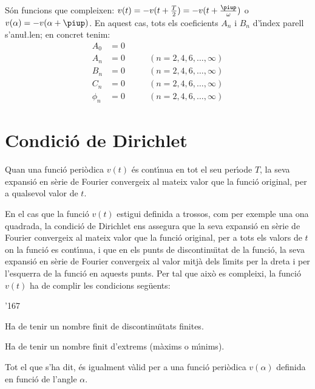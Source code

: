 S\'{o}n funcions que compleixen: $v(t) = -v(t+\frac{T}{2})=
-v(t+\frac{\piup}{\omega})$ o $v(\alpha) = -v(\alpha+\piup)$. En aquest
cas, tots els coeficients $A_n$ i $B_n$ d'\'{\i}ndex parell s'anu{\l.l}en;
en concret tenim:
\begin{subequations}
\begin{alignat}{2}
    A_0 &= 0       & \\[0.5ex]
    A_n &= 0       &\qquad (n = 2,4,6,\ldots,\infty)\\[0.5ex]
    B_n &= 0       &\qquad (n = 2,4,6,\ldots,\infty)\\[0.5ex]
    C_n &= 0       &\qquad (n = 2,4,6,\ldots,\infty)\\[0.5ex]
    \phi_n &= 0 &\qquad (n = 2,4,6,\ldots,\infty)
\end{alignat}
\end{subequations}

\section{Condici\'{o} de Dirichlet}

Quan una funci\'{o} peri\`{o}dica $v(t)$  \'{e}s cont\'{\i}nua en tot el seu per\'{\i}ode
$T$, la seva expansi\'{o} en s\`{e}rie de Fourier convergeix al mateix valor
que la funci\'{o} original, per a qualsevol valor de $t$.

En el cas que la funci\'{o} $v(t)$ estigui definida a trossos, com per
exemple una ona quadrada, la condici\'{o} de Dirichlet ens assegura que
la seva expansi\'{o} en s\`{e}rie de Fourier convergeix al mateix valor que
la funci\'{o} original, per a tots els valors de $t$ on la funci\'{o} es
cont\'{\i}nua, i que en els punts de discontinu\"{\i}tat de la funci\'{o}, la seva
expansi\'{o} en s\`{e}rie de Fourier convergeix al valor mitj\`{a} dels l\'{\i}mits
per la dreta i per l'esquerra de la funci\'{o} en aquests punts. Per tal
que aix\`{o} es compleixi, la funci\'{o} $v(t)$ ha de complir les condicions
seg\"{u}ents:
\begin{dinglist}{'167}
   \item Ha de tenir un nombre finit de discontinu\"{\i}tats
   finites.
   \item Ha de tenir un nombre finit d'extrems (m\`{a}xims o m\'{\i}nims).
\end{dinglist}

Tot el que s'ha dit, \'{e}s igualment v\`{a}lid per a una funci\'{o} peri\`{o}dica
$v(\alpha)$  definida en funci\'{o} de l'angle $\alpha$.

